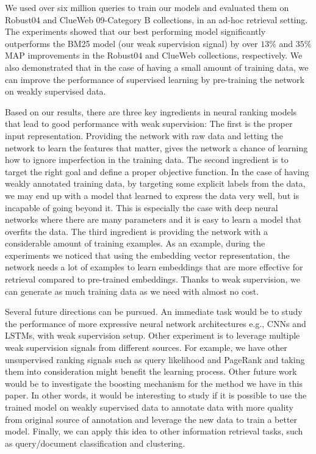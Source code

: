 \documentclass[sigconf]{acmart}
\newcommand{\feedthree}{embedding vector representation\xspace}
\begin{document}
We used over six million queries to train our models and evaluated them on Robust04 and ClueWeb 09-Category B collections, in an ad-hoc retrieval setting. 
The experiments showed that our best performing model significantly outperforms the BM25 model (our weak supervision signal) by over $13\%$ and $35\%$ MAP improvements in the Robust04 and ClueWeb collections, respectively. 
We also demonstrated that in the case of having a small amount of training data, we can improve the performance of supervised learning by pre-training the network on weakly supervised data.

Based on our results, there are three key ingredients in neural ranking models that lead to good performance with weak supervision:
The first is the proper input representation. Providing the network with raw data and letting the network to learn the features that matter, gives the network a chance of learning how to ignore imperfection in the training data.
The second ingredient is to target the right goal and define a proper objective function. In the case of having weakly annotated training data, by targeting some explicit labels from the data, we may end up with a model that learned to express the data very well, but is incapable of going beyond it. 
This is especially the case with deep neural networks where there are many parameters and it is easy to learn a model that overfits the data.
The third ingredient is providing the network with a considerable amount of training examples. 
As an example, during the experiments we noticed that using the \feedthree, the network needs a lot of examples to learn embeddings that are more effective for retrieval compared to pre-trained embeddings. 
Thanks to weak supervision, we can generate as much training data as we need with almost no cost.



Several future directions can be pursued. 
An immediate task would be to study the performance of more expressive neural network architectures e.g., CNNs and LSTMs, with weak supervision setup.  
Other experiment is to leverage multiple weak supervision signals from different sources. For example, we have other unsupervised ranking signals such as query likelihood and PageRank and taking them into consideration might benefit the learning process. 
Other future work would be to investigate the boosting mechanism for the method we have in this paper. In other words, it would be interesting to study if it is possible to use the trained model on weakly supervised data to annotate data with more quality from original source of annotation and leverage the new data to train a better model. 
Finally, we can apply this idea to other information retrieval tasks, such as query/document classification and clustering.
\end{document}
